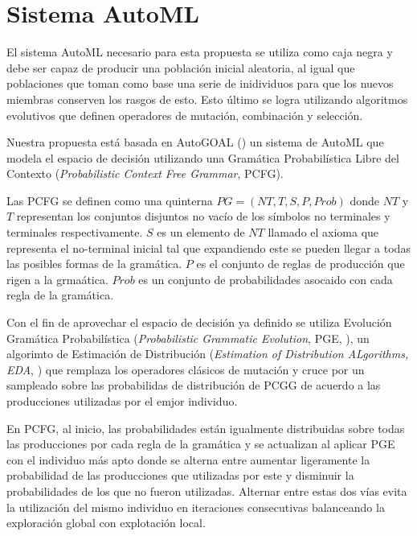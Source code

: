 \section{Sistema AutoML}
El sistema AutoML necesario para esta propuesta se utiliza como caja negra y debe ser capaz de producir una poblaci\'on inicial aleatoria, al igual que poblaciones que toman como base una serie de inidividuos para que los nuevos miembras conserven los rasgos de esto. Esto \'ultimo se logra utilizando algoritmos evolutivos que definen operadores de mutaci\'on, combinaci\'on y selecci\'on.

Nuestra propuesta est\'a basada en AutoGOAL (\cite{estevez2020solving}) un sistema de AutoML que modela el espacio de decisi\'on utilizando una Gram\'atica Probabil\'istica  Libre del Contexto (\textit{Probabilistic Context Free Grammar}, PCFG). 

Las PCFG se definen como una quinterna $PG = (NT, T, S, P, Prob)$ donde $NT$ y $T$ representan los conjuntos disjuntos no vac\'io de los s\'imbolos no terminales y terminales respectivamente. $S$ es un elemento de $NT$ llamado el axioma que representa el no-terminal inicial tal que expandiendo este se pueden llegar a todas las posibles formas de la gram\'atica. $P$ es el conjunto de reglas de producci\'on que rigen a la grma\'atica. $Prob$  es un conjunto de probabilidades asocaido con cada regla de la gram\'atica. 

Con el fin de aprovechar el espacio de decisi\'on ya definido se utiliza Evoluci\'on Gram\'atica Probabil\'istica (\textit{Probabilistic Grammatic Evolution}, PGE, \cite{megane2021probabilistic}), un algorimto de Estimaci\'on de Distribuci\'on (\textit{Estimation of Distribution ALgorithms, EDA}, \cite{larranaga2001estimation}) que remplaza los operadores cl\'asicos de mutaci\'on y cruce por un sampleado sobre las probabilidas de distribuci\'on de PCGG de acuerdo a las producciones utilizadas por el emjor individuo.

En PCFG, al inicio, las probabilidades est\'an igualmente distribuidas sobre todas las producciones por cada regla de la gram\'atica y se actualizan al aplicar PGE con el individuo m\'as apto donde se alterna entre aumentar ligeramente la probabilidad de las producciones que utilizadas por este y disminuir la probabilidades de los que no fueron utilizadas. Alternar entre estas dos v\'ias evita la utilizaci\'on del mismo individuo en iteraciones consecutivas balanceando la exploraci\'on global con explotaci\'on local.

